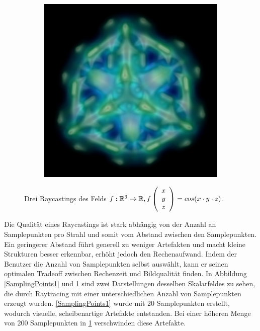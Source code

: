 \documentclass[a4paper,fontsize=12pt,toc=bib,halfparskip]{scrartcl}
\begin{document}
\begin{figure}
\begin{subfigure}{0.30\textwidth}
		\subcaption{}
		\label{SamplingPoints2}
	\end{subfigure}
	\hfill
	\begin{subfigure}{0.30\textwidth}
		\includegraphics[width=\textwidth]{pictures/DVR3.png}
		\subcaption{}
		\label{SamplingPoints3}
	\end{subfigure}
	\caption{Drei Raycastings des Felds $f:\mathbb{R}^3\rightarrow\mathbb{R}, f\left(\protect\begin{array}{c}x\\y\\z\protect\end{array}\right)=cos(x\cdot y\cdot z)$.}
	\label{SamplingPoints}
\end{figure}

Die Qualit\"at eines Raycastings ist stark abh\"angig von der Anzahl an Samplepunkten pro Strahl und somit vom Abstand zwischen den Samplepunkten. Ein geringerer Abstand f\"uhrt generell zu weniger Artefakten und macht kleine Strukturen besser erkennbar, erh\"oht jedoch den Rechenaufwand. Indem der Benutzer die Anzahl von Samplepunkten selbst ausw\"ahlt, kann er seinen optimalen Tradeoff zwischen Rechenzeit und Bildqualit\"at finden. In Abbildung \ref{SamplingPoints1} und \ref{SamplingPoints2} sind zwei Darstellungen desselben Skalarfeldes zu sehen, die durch Raytracing mit einer unterschiedlichen Anzahl von Samplepunkten erzeugt wurden. \ref{SamplingPoints1} wurde mit 20 Samplepunkten erstellt, wodurch visuelle, scheibenartige Artefakte entstanden. Bei einer h\"oheren Menge von 200 Samplepunkten in \ref{SamplingPoints2} verschwinden diese Artefakte.
\end{document}
